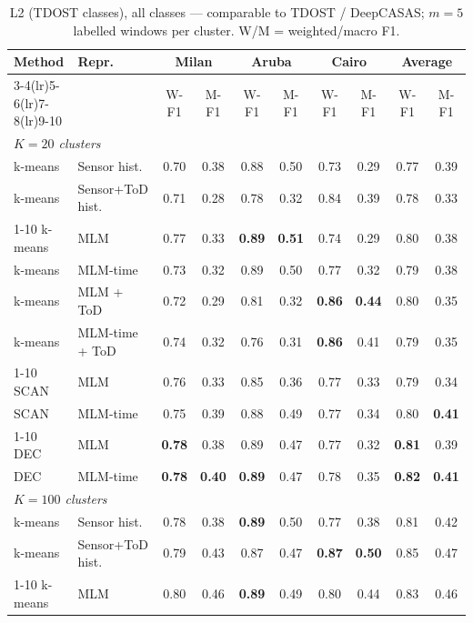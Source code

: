 \begin{table}[t]
\centering\small
\caption{L2 (TDOST classes), all classes --- comparable to TDOST / DeepCASAS; $m=5$ labelled windows per cluster. W/M = weighted/macro F1.}
\label{tab:l2_all_m5}
\setlength{\tabcolsep}{4pt}
\begin{tabular}{llcccccc|cc}
\toprule
Method & Repr. & \multicolumn{2}{c}{Milan} & \multicolumn{2}{c}{Aruba} & \multicolumn{2}{c}{Cairo} & \multicolumn{2}{c}{Average} \\
\cmidrule(lr){3-4}\cmidrule(lr){5-6}\cmidrule(lr){7-8}\cmidrule(lr){9-10}
 & & W-F1 & M-F1 & W-F1 & M-F1 & W-F1 & M-F1 & W-F1 & M-F1 \\
\midrule
\multicolumn{10}{l}{\textit{$K = 20$ clusters}} \\
\midrule
k-means & Sensor hist. & 0.70 & 0.38 & 0.88 & 0.50 & 0.73 & 0.29 & 0.77 & 0.39 \\
k-means & Sensor+ToD hist. & 0.71 & 0.28 & 0.78 & 0.32 & 0.84 & 0.39 & 0.78 & 0.33 \\
\cmidrule{1-10}
k-means & MLM & 0.77 & 0.33 & \textbf{0.89} & \textbf{0.51} & 0.74 & 0.29 & 0.80 & 0.38 \\
k-means & MLM-time & 0.73 & 0.32 & 0.89 & 0.50 & 0.77 & 0.32 & 0.79 & 0.38 \\
k-means & MLM + ToD & 0.72 & 0.29 & 0.81 & 0.32 & \textbf{0.86} & \textbf{0.44} & 0.80 & 0.35 \\
k-means & MLM-time + ToD & 0.74 & 0.32 & 0.76 & 0.31 & \textbf{0.86} & 0.41 & 0.79 & 0.35 \\
\cmidrule{1-10}
SCAN & MLM & 0.76 & 0.33 & 0.85 & 0.36 & 0.77 & 0.33 & 0.79 & 0.34 \\
SCAN & MLM-time & 0.75 & 0.39 & 0.88 & 0.49 & 0.77 & 0.34 & 0.80 & \textbf{0.41} \\
\cmidrule{1-10}
DEC & MLM & \textbf{0.78} & 0.38 & 0.89 & 0.47 & 0.77 & 0.32 & \textbf{0.81} & 0.39 \\
DEC & MLM-time & \textbf{0.78} & \textbf{0.40} & \textbf{0.89} & 0.47 & 0.78 & 0.35 & \textbf{0.82} & \textbf{0.41} \\
\midrule
\multicolumn{10}{l}{\textit{$K = 100$ clusters}} \\
\midrule
k-means & Sensor hist. & 0.78 & 0.38 & \textbf{0.89} & 0.50 & 0.77 & 0.38 & 0.81 & 0.42 \\
k-means & Sensor+ToD hist. & 0.79 & 0.43 & 0.87 & 0.47 & \textbf{0.87} & \textbf{0.50} & 0.85 & 0.47 \\
\cmidrule{1-10}
k-means & MLM & 0.80 & 0.46 & \textbf{0.89} & 0.49 & 0.80 & 0.44 & 0.83 & 0.46 \\

\end{tabular}
\end{table}
